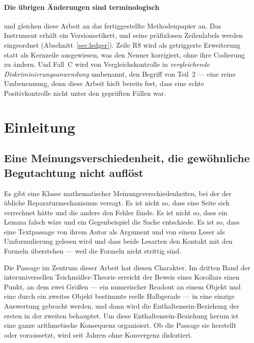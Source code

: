 \documentclass[11pt,a4paper]{article}
\theoremstyle{definition}
\begin{document}
\paragraph{Die übrigen Änderungen sind terminologisch} und gleichen diese Arbeit
an das fertiggestellte Methodenpapier an. Das Instrument erhält ein
Versionsetikett, und seine präfixlosen Zeilenlabels werden eingeordnet
(Abschnitt~\ref{sec:ledger}). Zeile R8 wird als getriggerte Erweiterung statt als
Kernzeile ausgewiesen, was den Nenner korrigiert, ohne ihre Codierung zu ändern.
Und Fall~C wird von \glqq Vergleichskontrolle\grqq{} in \emph{vergleichende
Diskriminierungsanwendung} umbenannt, den Begriff von Teil~2 --- eine reine
Umbenennung, denn diese Arbeit hielt bereits fest, dass eine echte
Positivkontrolle nicht unter den geprüften Fällen war.

\clearpage

\section{Einleitung}
\label{sec:intro}

\subsection{Eine Meinungsverschiedenheit, die gewöhnliche Begutachtung nicht auflöst}

Es gibt eine Klasse mathematischer Meinungsverschiedenheiten, bei der der übliche
Reparaturmechanismus versagt. Es ist nicht so, dass eine Seite sich verrechnet
hätte und die andere den Fehler fände. Es ist nicht so, dass ein Lemma falsch
wäre und ein Gegenbeispiel die Sache entschiede. Es ist so, dass eine Textpassage
von ihrem Autor als Argument und von einem Leser als Umformulierung gelesen wird
und dass beide Lesarten den Kontakt mit den Formeln überstehen --- weil die
Formeln nicht strittig sind.

Die Passage im Zentrum dieser Arbeit hat diesen Charakter. Im dritten Band der
interuniversellen Teichmüller-Theorie erreicht der Beweis eines Korollars einen
Punkt, an dem zwei Größen --- ein numerischer Readout an einem Objekt und eine
durch ein zweites Objekt bestimmte reelle Halbgerade --- in eine einzige
Auswertung gebracht werden, und dann wird die Enthaltensein-Beziehung der ersten
in der zweiten behauptet. Um diese Enthaltensein-Beziehung herum ist eine ganze
arithmetische Konsequenz organisiert. Ob die Passage sie herstellt oder
voraussetzt, wird seit Jahren ohne Konvergenz diskutiert.
\end{document}

